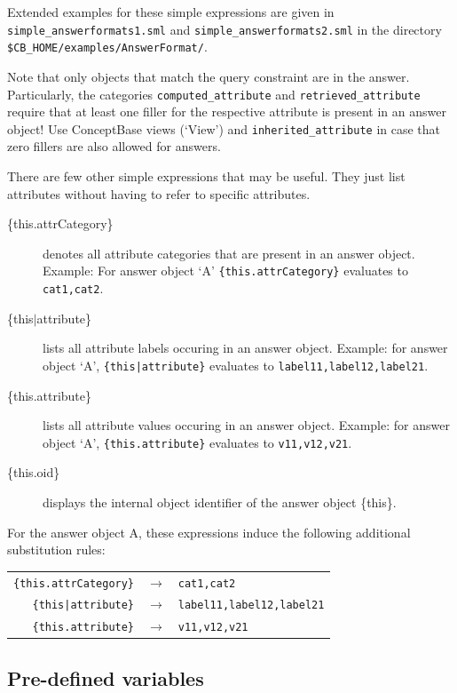 Extended examples for these simple expressions are given in {\tt simple\_answerformats1.sml} and {\tt simple\_answerformats2.sml} in
the directory \verb+$CB_HOME/examples/AnswerFormat/+.

Note that only objects that match the query constraint are in the answer. Particularly, the categories {\tt computed\_attribute} and {\tt retrieved\_attribute}
require that at least one filler for the respective attribute is present in an answer object!
Use ConceptBase views (`View') and {\tt inherited\_attribute} in case that
zero fillers are also allowed for answers.

There are few other simple expressions that may be useful. They just list attributes without having to refer to specific attributes.

\begin{description}
\item[\{this.attrCategory\}]
denotes all attribute categories that are present in an answer object. Example: For answer object `A' \verb+{this.attrCategory}+ evaluates to {\tt cat1,cat2}.

\item[\{this$\mid$attribute\}]
lists all attribute labels occuring in an answer object. Example: for answer object `A', \verb+{this|attribute}+ evaluates to {\tt label11,label12,label21}.

\item[\{this.attribute\}]
lists all attribute values occuring in an answer object. Example: for answer object `A', \verb+{this.attribute}+ evaluates to {\tt v11,v12,v21}.

\item[\{this.oid\}]
displays the internal object identifier of the answer object \{this\}.
\end{description}

For the answer object A, these expressions induce the following additional substitution rules:

\begin{tabular}{rcl}
    \verb+{this.attrCategory}+ & $\longrightarrow$ & {\tt cat1,cat2} \\
    \verb+{this|attribute}+ & $\longrightarrow$ & {\tt label11,label12,label21} \\
    \verb+{this.attribute}+ & $\longrightarrow$ & {\tt v11,v12,v21}\\
\end{tabular}


\subsection{Pre-defined variables}

